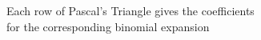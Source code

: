 \documentclass[preview]{standalone}
\begin{document}
\begin{center}
Each row of Pascal's Triangle gives the coefficients\\for the corresponding binomial expansion
\end{center}
\end{document}
